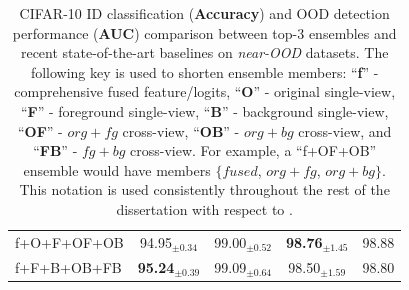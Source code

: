 \begin{table}
{\begin{tabular}{|l|c|ccc|}
f+O+F+OF+OB & 94.95$_{\pm 0.34}$ & 99.00$_{\pm 0.52}$ & \textbf{98.76$_{\pm 1.45}$} &  \multicolumn{1}{|c|}{98.88}  \\ 
f+F+B+OB+FB & \textbf{95.24$_{\pm 0.39}$} & 99.09$_{\pm 0.64}$ & 98.50$_{\pm 1.59}$ &  \multicolumn{1}{|c|}{98.80}  \\ \hline
\end{tabular}
}
\caption{CIFAR-10 ID classification (\textbf{Accuracy}) and OOD detection performance (\textbf{AUC}) comparison between top-3 \sysb ensembles and recent state-of-the-art baselines on \textit{near-OOD} datasets. %
The following key is used to shorten ensemble members: ``\textbf{f}'' - comprehensive fused feature/logits, ``\textbf{O}'' - original single-view, ``\textbf{F}'' - foreground single-view, ``\textbf{B}'' - background single-view, ``\textbf{OF}'' - $org+fg$ cross-view, ``\textbf{OB}'' - $org+bg$ cross-view, and ``\textbf{FB}'' - $fg+bg$ cross-view. For example, a ``f+OF+OB'' ensemble would have members $\{fused$, $org+fg$, $org+bg\}$. This notation is used consistently throughout the rest of the dissertation with respect to \sysb.
}
\label{tab:propwork-meo-results-cifar10-near}
\end{table}

